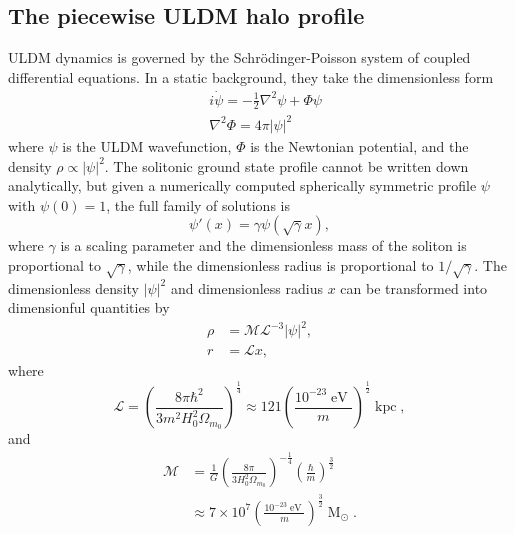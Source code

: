 \documentclass{pasa}%
\begin{document}
\subsection{The piecewise ULDM halo profile}

ULDM dynamics is governed by the Schr{\"o}dinger-Poisson system of coupled differential equations. In a static background, they take the dimensionless form  
%
\begin{align}
    &i\dot{\psi} = -\frac{1}{2}\nabla^2\psi+\Phi\psi \\
    &\nabla^2\Phi = 4\pi \vert \psi\vert^2
\end{align}
%
where $\psi$ is the ULDM wavefunction, $\Phi$ is the Newtonian potential, and the density $\rho \propto |\psi|^2$. The solitonic ground state profile cannot be written down analytically, but given a numerically computed spherically symmetric  profile $\psi$ with $\psi(0)=1$, the full family of solutions is
%
\begin{equation}
    \psi'(x) = \gamma\psi(\sqrt{\gamma}x),
\end{equation}
%
where $\gamma$ is a scaling parameter and the dimensionless mass of the soliton is proportional to $\sqrt{\gamma}$, while the dimensionless radius is proportional to $1/\sqrt{\gamma}$. The dimensionless density $\vert\psi\vert^2$ and dimensionless radius $x$ can be transformed into dimensionful quantities by
\begin{align}
    \rho &= \mathcal{M}\mathcal{L}^{-3}\vert\psi\vert^2, \label{eq:density_conv} \\
    r &= \mathcal{L}x, \label{eq:mass_conv}
\end{align}
where
\begin{equation}\label{eq:length}
    \mathcal{L}=\left(\frac{8\pi\hbar^2}{3 m^2H_0^2\Omega_{m_0}}\right)^{\frac{1}{4}}\approx121\left(\frac{10^{-23}\operatorname{eV}}{m}\right)^{\frac{1}{2}}\operatorname{kpc},
\end{equation}
%
and 
%
\begin{align}\label{eq:mass}
    \mathcal{M}&=\frac{1}{G}\left(\frac{8\pi}{3 H_0^2\Omega_{m_0}}\right)^{-\frac{1}{4}}\left(\frac{\hbar}{m}\right)^{\frac{3}{2}}\nonumber\\
    &\approx 7\times 10^7\left(\frac{10^{-23}\operatorname{eV}}{m}\right)^{\frac{3}{2}}\operatorname{M}_{\odot}.
\end{align}
\end{document}
